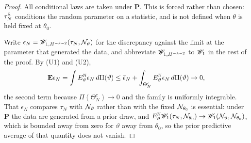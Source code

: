 \begin{proof}
All conditional laws are taken under $\mathbf{P}$. This is forced rather than chosen: $\tau^{\rm S}_N$ conditions the random parameter on a statistic, and is not defined when $\theta$ is held fixed at $\theta_0$.

Write $\epsilon_N=\mathscr{W}_{1,H^{-k-2}}(\tau_N,\mathcal{N}_\vartheta)$ for the discrepancy against the limit at the parameter that generated the data, and abbreviate $\mathscr{W}_{1,H^{-k-2}}$ to $\mathscr{W}_1$ in the rest of the proof. By (U1) and (U2),
\[
\mathbf{E}\epsilon_N=\int E^{\mathbb{N}}_\vartheta\epsilon_N\,d\Pi(\vartheta)\le\bar\epsilon_N+\int_{\Theta_N^c}E^{\mathbb{N}}_\vartheta\epsilon_N\,d\Pi(\vartheta)\to0 ,
\]
the second term because $\Pi(\Theta_N^c)\to0$ and the family is uniformly integrable. That $\epsilon_N$ compares $\tau_N$ with $\mathcal{N}_\vartheta$ rather than with the fixed $\mathcal{N}_{\theta_0}$ is essential: under $\mathbf{P}$ the data are generated from a prior draw, and $E^{\mathbb{N}}_\vartheta\mathscr{W}_1(\tau_N,\mathcal{N}_{\theta_0})\to\mathscr{W}_1(\mathcal{N}_\vartheta,\mathcal{N}_{\theta_0})$, which is bounded away from zero for $\vartheta$ away from $\theta_0$, so the prior predictive average of that quantity does not vanish.


\end{proof}
